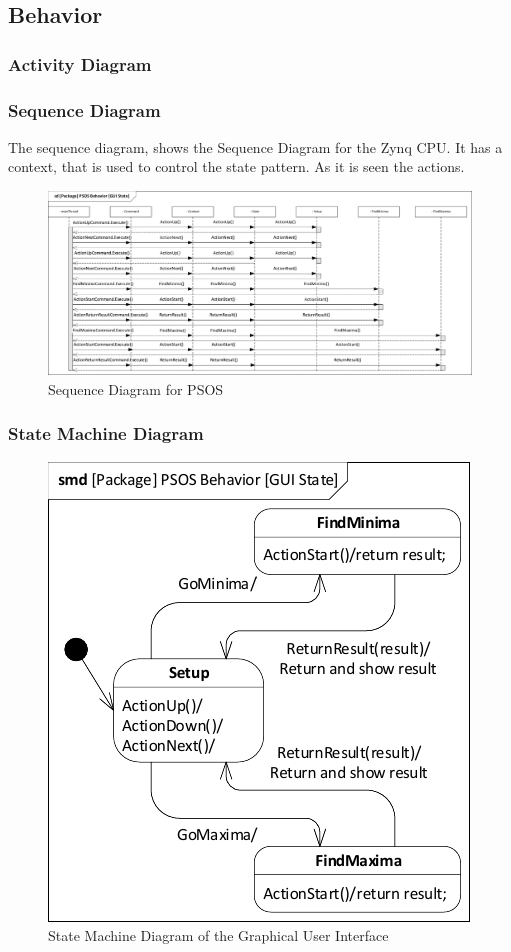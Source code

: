 \subsection{Behavior} \label{requirementspecification:Behavior}

\subsubsection{Activity Diagram}

\subsubsection{Sequence Diagram}
The sequence diagram, shows the Sequence Diagram for the Zynq CPU.
It has a context, that is used to control the state pattern. As it is seen the actions.

\begin{figure}[H]
	\centering
	\includegraphics[width=1\linewidth]{diagram/sd_psos}
	\caption{Sequence Diagram for PSOS}
	\label{fig:sdpsos}
\end{figure}



\subsubsection{State Machine Diagram}\label{req:smd}

\begin{figure}[H]
	\centering
	\includegraphics[width=0.7\linewidth]{diagram/smd_gui_state}
	\caption{State Machine Diagram of the Graphical User Interface}
	\label{fig:smdguistate}
\end{figure}
